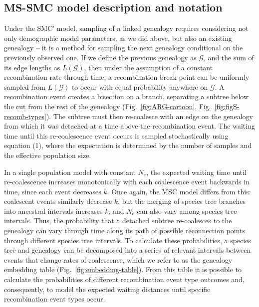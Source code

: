 \documentclass[11pt]{article}
\begin{document}
\subsection{MS-SMC model description and notation}
Under the SMC' model, sampling of a linked genealogy requires considering not only 
demographic model parameters, 
as we did above, but also an existing genealogy -- it is a method 
for sampling the next genealogy conditional on the previously observed one. 
If we define the previous genealogy as $\mathcal{G}$, and the sum of its edge lengths 
as $L(\mathcal{G})$, then under the assumption of a constant recombination rate through time,
a recombination break point can be uniformly sampled from $L(\mathcal{G})$ to occur with 
equal probability anywhere on $\mathcal{G}$. 
A recombination event creates a bisection on a branch, separating a subtree 
below the cut from the rest of the genealogy 
(Fig.~\ref{fig:ARG-cartoon}, Fig.~\ref{fig:figS-recomb-types}).
The subtree must then re-coalesce 
with an edge on the genealogy from which it was detached at a time
above the recombination event.
The waiting time until this re-coalescence event occurs is sampled 
stochastically 
using equation (1), where the expectation is determined by the 
number of samples and the effective population size.


In a single population model with constant $N_e$, the expected waiting time until 
re-coalescence increases monotonically with each coalescence event 
backwards in time, since each event decreases $k$.
Once again, the MSC model differs from this: 
coalescent events similarly decrease $k$, but the merging of 
species tree branches into ancestral intervals increases $k$, and $N_e$ 
can also vary among species tree intervals. 
Thus, the probability that a detached subtree re-coalesces to the genealogy 
can vary through time along its path of possible reconnection points through 
different species tree intervals.
To calculate these probabilities, a species tree and genealogy can be decomposed into a 
series of relevant intervals between events that change rates of coalescence,
which we refer to as the genealogy embedding table 
(Fig.~\ref{fig:embedding-table}).
From this table it is possible to calculate the probabilities of different
recombination event type outcomes and, consequently, to model the expected 
waiting distances until specific recombination event types occur. 
\end{document}
